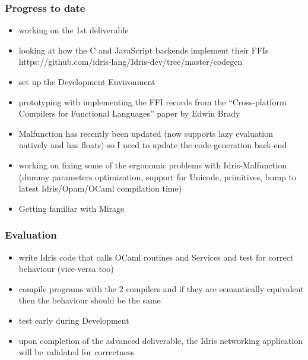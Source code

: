 \documentclass{beamer}
\begin{document}
\begin{frame}
	\frametitle{Progress to date}

	\begin{itemize}
		\item working on the 1st deliverable
		      \pause
		\item looking at how the C and JavaScript backends implement
		      their FFIs https://github.com/idris-lang/Idris-dev/tree/master/codegen
		      \pause
		\item set up the Development Environment
		      \pause
		\item prototyping with implementing the FFI records from the
		      ``Cross-platform Compilers for Functional Languages'' paper
		      by Edwin Brady
		      \pause
		\item Malfunction has recently been updated (now supports
		      lazy evaluation natively and has floats) so I need
		      to update the code generation back-end
		      \pause
		\item working on fixing some of the ergonomic problems with
		      Idris-Malfunction (dummy parameters optimization, support for Unicode,
		      primitives, bump to latest Idris/Opam/OCaml compilation time)
		      \pause
		\item Getting familiar with Mirage
	\end{itemize}

\end{frame}


\begin{frame}
	\frametitle{Evaluation}

	\begin{itemize}
		\item write Idris code that calls OCaml routines and Services
		      and test for correct behaviour (vice-versa too)
		\item compile programs with the 2 compilers and if
		      they are semantically equivalent then the behaviour should
		      be the same
		\item test early during Development
		\item upon completion of the advanced deliverable,
		      the Idris networking application will be validated for
		      correctness
	\end{itemize}
\end{frame}
\end{document}
